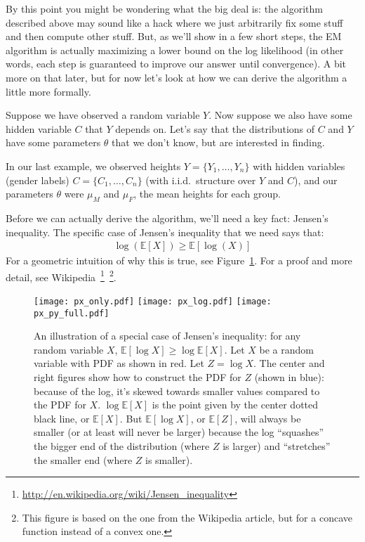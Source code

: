 \documentclass[12pt]{article}
\newcommand{\E}[1]{\mathbb{E}\left[#1\right]}
\begin{document}
    By this point you might be wondering what the big deal is: the algorithm
    described above may sound like a hack where we just arbitrarily fix some
    stuff and then compute other stuff. But, as we'll show in a few short
    steps, the EM algorithm is actually maximizing a lower bound on the log
    likelihood (in other words, each step is guaranteed to improve our answer
    until convergence). A bit more on that later, but for now let's look at how
    we can derive the algorithm a little more formally.

    Suppose we have observed a random variable $Y$.  Now suppose we also have
    some hidden variable $C$ that $Y$ depends on. Let's say that the
    distributions of $C$ and $Y$ have some parameters $\theta$ that we don't
    know, but are interested in finding.

    In our last example, we observed heights $Y = \{Y_1, \ldots, Y_n\}$ with
    hidden variables (gender labels) $C = \{C_1, \ldots, C_n\}$ (with i.i.d.\
    structure over $Y$ and $C$), and our parameters $\theta$ were $\mu_M$ and
    $\mu_F$, the mean heights for each group.

    Before we can actually derive the algorithm, we'll need a key fact: Jensen's
    inequality. The specific case of Jensen's inequality that we need
    says that:
    \begin{align}
        \label{eq:jensen-log}\log(\mathbb{E}[X]) \geq \mathbb{E}[\log(X)]
    \end{align}
    For a geometric intuition of why this is true, see Figure~\ref{fig:jensen}.
    For a proof and more detail, see
    Wikipedia~\footnote{\url{http://en.wikipedia.org/wiki/Jensen_inequality}}~\footnote{This
        figure is based on the one from the Wikipedia article, but for a
    concave function instead of a convex one.}.
    \begin{figure}[t]
        \centering
            \hspace*{\fill}
            \texttt{[image: px\_only.pdf]}
            \hfill
            \texttt{[image: px\_log.pdf]}
            \hfill
            \texttt{[image: px\_py\_full.pdf]}
            \hspace*{\fill}
        \caption{An illustration of a special case of Jensen's inequality:
            for any random variable $X$, $\mathbb{E}[\log X] \geq \log \mathbb{E}[X]$. Let
            $X$ be a random variable with PDF as shown in red. Let
            $Z=\log X$. The center and right figures show how to construct
            the PDF for $Z$ (shown in blue): because of the log, it's skewed towards
            smaller values compared to the PDF for $X$. $\log\mathbb{E}[X]$ is the point given by the
            center dotted black line, or $\E{X}$. But $\E{\log X}$, or 
            $\E{Z}$, will always be smaller (or at least will never be larger) because the log ``squashes''
            the bigger end of the distribution (where $Z$ is larger) and ``stretches'' the smaller
            end (where $Z$ is smaller).}
        \label{fig:jensen}
    \end{figure}
\end{document}
